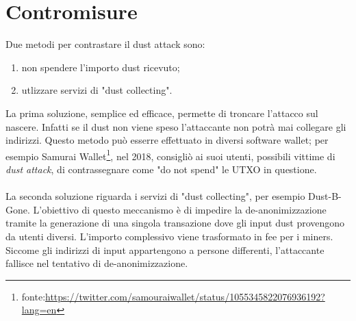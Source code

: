 \section{Contromisure}
Due metodi per contrastare il dust attack sono:
    \begin{enumerate}
        \item non spendere l'importo dust ricevuto; 
        \item utlizzare servizi di "dust collecting". 
    \end{enumerate}
La prima soluzione, semplice ed efficace, permette di troncare l'attacco sul nascere. Infatti se il dust non viene speso l'attaccante non potrà mai collegare gli indirizzi. 
Questo metodo può esserre effettuato in diversi software wallet; per esempio Samurai Wallet\footnote{fonte:\url{https://twitter.com/samouraiwallet/status/1055345822076936192?lang=en}}, nel 2018, consigliò ai suoi utenti, possibili vittime di \textit{dust attack},  di contrassegnare come "do not spend" le UTXO in questione.\\\\
La seconda soluzione riguarda i servizi di "dust collecting", per esempio Dust-B-Gone\cite{Dbg}.
L'obiettivo di questo meccanismo è di impedire la de-anonimizzazione tramite la generazione di una singola transazione dove gli input dust provengono da utenti diversi. L'importo complessivo viene trasformato in fee per i miners. \\Siccome gli indirizzi di input appartengono a persone differenti, l'attaccante fallisce nel tentativo di de-anonimizzazione.